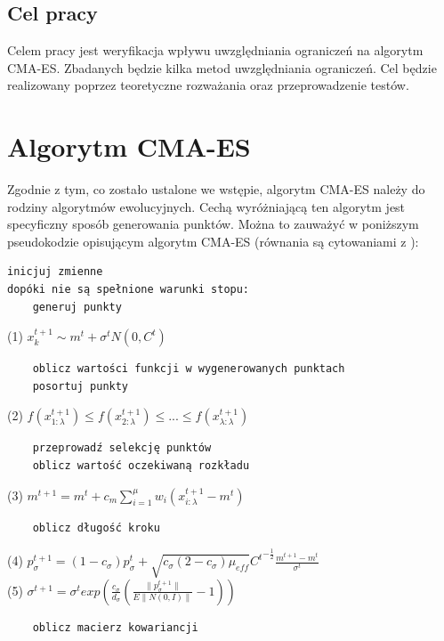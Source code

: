 \documentclass{mini}
\newcommand{\CMAES}{\mbox{CMA-ES}}
\begin{document}
\subsection*{Cel pracy}
Celem pracy jest weryfikacja wpływu uwzględniania ograniczeń na algorytm \CMAES. Zbadanych będzie kilka metod uwzględniania ograniczeń. Cel będzie realizowany poprzez teoretyczne rozważania oraz przeprowadzenie testów.

\pagebreak

\section{Algorytm CMA-ES} \label{secalgcmaes}

Zgodnie z tym, co zostało ustalone we wstępie, algorytm CMA-ES należy do rodziny algorytmów ewolucyjnych. Cechą wyróżniającą ten algorytm jest specyficzny sposób generowania punktów. Można to zauważyć w poniższym pseudokodzie opisującym algorytm CMA-ES (równania są cytowaniami z \cite{cmaes_tutorial}):
\begin{Verbatim}
inicjuj zmienne
dopóki nie są spełnione warunki stopu:
	generuj punkty
\end{Verbatim}
(1)\hspace{12ex} $x_k^{t+1} \sim m^t + \sigma^tN(0,C^t)$
\begin{Verbatim}
	oblicz wartości funkcji w wygenerowanych punktach
	posortuj punkty
\end{Verbatim}
(2)\hspace{12ex} $f(x_{1:\lambda}^{t+1}) \leq f(x_{2:\lambda}^{t+1}) \leq ... \leq f(x_{\lambda:\lambda}^{t+1})$
\begin{Verbatim}
	przeprowadź selekcję punktów
	oblicz wartość oczekiwaną rozkładu
\end{Verbatim}
(3)\hspace{12ex} $m^{t+1}=m^t+c_m\sum\limits_{i=1}^\mu w_i(x_{i:\lambda}^{t+1}-m^t)$
\begin{Verbatim}
	oblicz długość kroku
\end{Verbatim}
(4)\hspace{12ex} $p_\sigma^{t+1}=(1-c_\sigma)p_\sigma^t+\sqrt{c_\sigma(2-c_\sigma)\mu_{eff}}{C^t}^{-\frac{1}{2}}\frac{m^{t+1}-m^t}{\sigma^t}$ \\
(5)\hspace{12ex} $\sigma^{t+1}=\sigma^t exp (\frac{c_\sigma}{d_\sigma}(\frac{\|p_\sigma^{t+1}\|}{E\|N(0,I)\|}-1))$
\begin{Verbatim}
	oblicz macierz kowariancji
\end{Verbatim}
\end{document}
